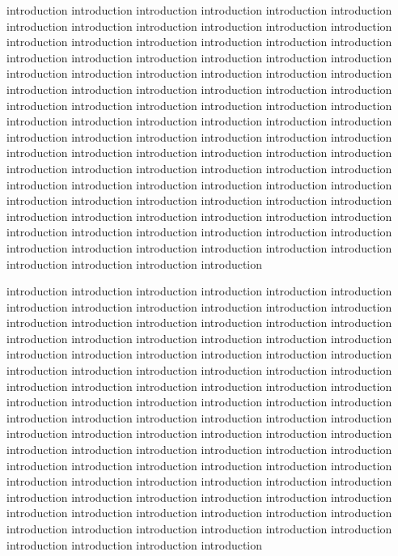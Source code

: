 \documentclass[platex,ja=standard,12pt,a4paper,twoside,onecolumn,fleqn,dvipdfmx,english]{bxjsbook}
\begin{document}
introduction introduction introduction introduction introduction introduction introduction introduction introduction introduction introduction introduction introduction introduction introduction introduction introduction introduction introduction introduction introduction introduction introduction introduction introduction introduction introduction introduction introduction introduction introduction introduction introduction introduction introduction introduction introduction introduction introduction introduction introduction introduction introduction introduction introduction introduction introduction introduction introduction introduction introduction introduction introduction introduction introduction introduction introduction introduction introduction introduction introduction introduction introduction introduction introduction introduction introduction introduction introduction introduction introduction introduction introduction introduction introduction introduction introduction introduction introduction introduction introduction introduction introduction introduction introduction introduction introduction introduction introduction introduction introduction introduction introduction introduction introduction introduction introduction introduction introduction introduction

introduction introduction introduction introduction introduction introduction introduction introduction introduction introduction introduction introduction introduction introduction introduction introduction introduction introduction introduction introduction introduction introduction introduction introduction introduction introduction introduction introduction introduction introduction introduction introduction introduction introduction introduction introduction introduction introduction introduction introduction introduction introduction introduction introduction introduction introduction introduction introduction introduction introduction introduction introduction introduction introduction introduction introduction introduction introduction introduction introduction introduction introduction introduction introduction introduction introduction introduction introduction introduction introduction introduction introduction introduction introduction introduction introduction introduction introduction introduction introduction introduction introduction introduction introduction introduction introduction introduction introduction introduction introduction introduction introduction introduction introduction introduction introduction introduction introduction introduction introduction
\end{document}
